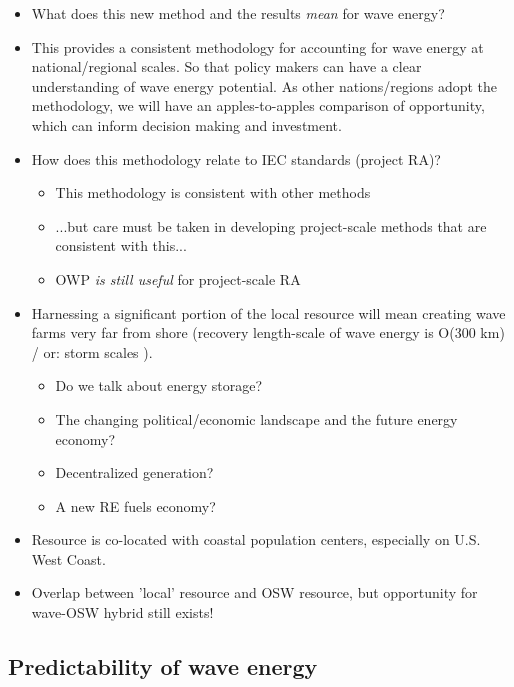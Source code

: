 
\begin{itemize}
\item What does this new method and the results {\it mean} for wave energy?
\item This provides a consistent methodology for accounting for wave energy at national/regional scales. So that policy makers can have a clear understanding of wave energy potential. As other nations/regions adopt the methodology, we will have an apples-to-apples comparison of opportunity, which can inform decision making and investment.
\item How does this methodology relate to IEC standards (project RA)?
  \begin{itemize}
  \item This methodology is consistent with other methods
  \item ...but care must be taken in developing project-scale methods that are consistent with this...
  \item OWP {\it is still useful} for project-scale RA
  \end{itemize}
\item Harnessing a significant portion of the local resource will mean creating wave farms very far from shore (recovery length-scale of wave energy is O(300 km) / or: storm scales ).
  \begin{itemize}
  \item Do we talk about energy storage?
  \item The changing political/economic landscape and the future energy economy?
  \item Decentralized generation?
  \item A new RE fuels economy?
  \end{itemize}
\item Resource is co-located with coastal population centers, especially on U.S. West Coast.
\item Overlap between 'local' resource and OSW resource, but opportunity for wave-OSW hybrid still exists!
\end{itemize}

\subsection{Predictability of wave energy}

